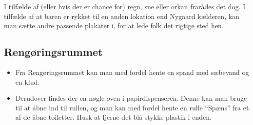 I tilfælde af (eller hvis der er chance for) regn, sne eller orkan
frarådes det dog.
I tilfælde af at baren er rykket til en anden lokation end Nygaard kælderen, 
kan man sætte andre passende plakater i, for at lede folk det rigtige sted hen.

\subsection{Rengøringsrummet}
\label{sec:pre:rengøring}
\begin{itemize}
	\item Fra Rengøringsrummet kan man med fordel hente en spand med sæbevand og en klud.
	\item Derudover findes der en nøgle oven i papirdispenseren. Denne kan man bruge til 
	at åbne ind til rullen, og man kan med fordel hente en rulle ``Spæns'' 
	fra et af de åbne toiletter. Husk at fjerne det blå stykke plastik i enden.
\end{itemize}